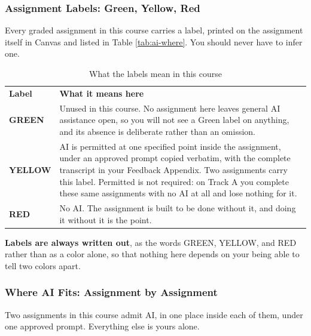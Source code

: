 \documentclass[11pt]{article}     %
\begin{document}
\subsubsection*{Assignment Labels: Green, Yellow, Red}

Every graded assignment in this course carries a label, printed on the assignment itself in Canvas and listed in Table \ref{tab:ai-where}. You should never have to infer one.

\begin{center}
\begin{table}[h]
    \caption{What the labels mean in this course}
    \label{tab:ai-labels}
    \centering
    \begin{tabularx}{\linewidth}{l L}
    \textbf{Label} & \textbf{What it means here} \\
    \textbf{GREEN} & Unused in this course. No assignment here leaves general AI assistance open, so you will not see a Green label on anything, and its absence is deliberate rather than an omission. \\
    \textbf{YELLOW} & AI is permitted at one specified point inside the assignment, under an approved prompt copied verbatim, with the complete transcript in your Feedback Appendix. Two assignments carry this label. Permitted is not required: on Track A you complete these same assignments with no AI at all and lose nothing for it. \\
    \textbf{RED} & No AI. The assignment is built to be done without it, and doing it without it is the point. \\
    \end{tabularx}
\end{table}
\end{center}

\noindent \textbf{Labels are always written out}, as the words GREEN, YELLOW, and RED rather than as a color alone, so that nothing here depends on your being able to tell two colors apart.

\subsubsection*{Where AI Fits: Assignment by Assignment}

Two assignments in this course admit AI, in one place inside each of them, under one approved prompt. Everything else is yours alone.
\end{document}
